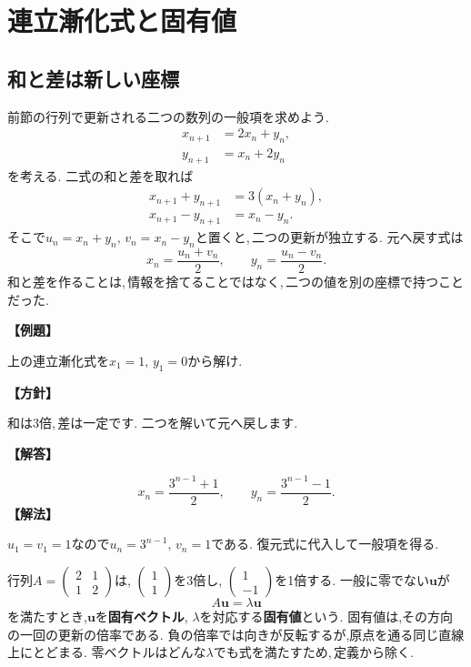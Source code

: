 \section{連立漸化式と固有値}\label{節：連立漸化式と固有値}
\subsection{和と差は新しい座標}

前節の行列で更新される二つの数列の一般項を求めよう.
\[
 \begin{aligned}
 x_{n+1}&=2x_n+y_n,\\
 y_{n+1}&=x_n+2y_n
 \end{aligned}
\]
を考える. 二式の和と差を取れば
\[
 \begin{aligned}
 x_{n+1}+y_{n+1}&=3(x_n+y_n),\\
 x_{n+1}-y_{n+1}&=x_n-y_n.
 \end{aligned}
\]
そこで$u_n=x_n+y_n,\,v_n=x_n-y_n$と置くと,\,二つの更新が独立する.
元へ戻す式は
\[
 x_n=\frac{u_n+v_n}{2},\qquad
 y_n=\frac{u_n-v_n}{2}.
\]
和と差を作ることは,\,情報を捨てることではなく,\,二つの値を別の座標で持つことだった.

\noindent\textbf{【例題】}\par\nobreak
上の連立漸化式を$x_1=1,\,y_1=0$から解け.

\noindent\textbf{【方針】}\par\nobreak
和は3倍,\,差は一定です. 二つを解いて元へ戻します.

\noindent\textbf{【解答】}\par\nobreak
\[
 x_n=\frac{3^{n-1}+1}{2},\qquad
 y_n=\frac{3^{n-1}-1}{2}.
\]
\noindent\textbf{【解法】}\par\nobreak
$u_1=v_1=1$なので$u_n=3^{n-1},\,v_n=1$である.
復元式に代入して一般項を得る.

行列$A=\begin{pmatrix}2&1\\1&2\end{pmatrix}$は,
$\begin{pmatrix}1\\1\end{pmatrix}$を3倍し,
$\begin{pmatrix}1\\-1\end{pmatrix}$を1倍する.
一般に零でない$\boldsymbol u$が
\[
 A\boldsymbol u=\lambda\boldsymbol u
\]
を満たすとき,$\boldsymbol u$を\textbf{固有ベクトル},
$\lambda$を対応する\textbf{固有値}という.
固有値は,その方向の一回の更新の倍率である.
負の倍率では向きが反転するが,原点を通る同じ直線上にとどまる.
零ベクトルはどんな$\lambda$でも式を満たすため,\,定義から除く.



